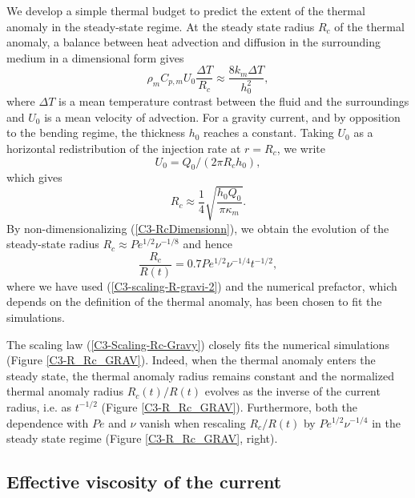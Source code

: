 We  develop a  simple  thermal budget  to predict  the  extent of  the
thermal  anomaly in  the  steady-state regime.   At  the steady  state
radius $R_c$ of the thermal  anomaly, a balance between heat advection
and diffusion in the surrounding medium in a dimensional form gives
\begin{equation}
  \rho_m C_{p,m} U_0 \frac{\Delta T}{R_c} \approx \frac{8 k_m \Delta T}{h_0^2},
\end{equation}
where $\Delta T$ is a mean  temperature contrast between the fluid and
the surroundings  and $U_0$ is  a mean  velocity of advection.   For a
gravity  current,  and  by  opposition  to  the  bending  regime,  the
thickness  $h_0$ reaches  a  constant. Taking  $U_0$  as a  horizontal
redistribution of the injection rate at $r=R_c$, we write
\begin{equation}
  U_0=Q_0/(2\pi R_c h_0),
\end{equation}
which gives
\begin{equation}
  R_c\approx\frac{1}{4}\sqrt{\frac{h_0 Q_0}{\pi \kappa_m}}.
  \label{C3-RcDimensionn}
\end{equation}
By   non-dimensionalizing  (\ref{C3-RcDimensionn}),   we  obtain   the
evolution of the steady-state  radius $R_c \approx Pe^{1/2}\nu^{-1/8}$
and hence
\begin{equation}
  \frac{R_c}{R(t)} = 0.7Pe^{1/2}\nu^{-1/4}t^{-1/2},
  \label{C3-Scaling-Rc-Gravy}
\end{equation}
where  we have  used  (\ref{C3-scaling-R-gravi-2})  and the  numerical
prefactor, which depends on the definition of the thermal anomaly, has
been chosen to fit the simulations.

The scaling law (\ref{C3-Scaling-Rc-Gravy}) closely fits the numerical
simulations  (Figure \ref{C3-R_Rc_GRAV}).   Indeed,  when the  thermal
anomaly enters  the steady state,  the thermal anomaly  radius remains
constant  and  the  normalized thermal  anomaly  radius  $R_c(t)/R(t)$
evolves  as the  inverse of  the current  radius, i.e.   as $t^{-1/2}$
(Figure  \ref{C3-R_Rc_GRAV}).  Furthermore,  both the  dependence with
$Pe$    and    $\nu$    vanish   when    rescaling    $R_c/R(t)$    by
$Pe^{1/2}\nu^{-1/4}$    in   the    steady   state    regime   (Figure
\ref{C3-R_Rc_GRAV}, right).

\subsection{Effective viscosity of the current}
\label{C3-sec:effect-visc-blist-g}

